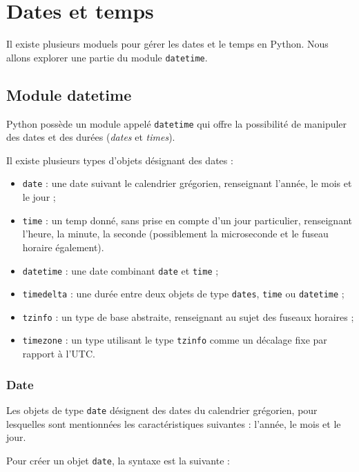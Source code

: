 \documentclass[
  12pt,
]{book}
\providecommand{\tightlist}{%
  \setlength{\itemsep}{0pt}\setlength{\parskip}{0pt}}
\numberwithin{equation}{section}
\numberwithin{countremarque}{section}
\begin{document}
\section{Dates et temps}\label{dates-et-temps}

Il existe plusieurs moduels pour gérer les dates et le temps en Python. Nous allons explorer une partie du module \texttt{datetime}.

\subsection{Module datetime}\label{module-datetime}

Python possède un module appelé \texttt{datetime} qui offre la possibilité de manipuler des dates et des durées (\emph{dates} et \emph{times}).

Il existe plusieurs types d'objets désignant des dates :

\begin{itemize}
\tightlist
\item
  \texttt{date} : une date suivant le calendrier grégorien, renseignant l'année, le mois et le jour ;
\item
  \texttt{time} : un temp donné, sans prise en compte d'un jour particulier, renseignant l'heure, la minute, la seconde (possiblement la microseconde et le fuseau horaire également).
\item
  \texttt{datetime} : une date combinant \texttt{date} et \texttt{time} ;
\item
  \texttt{timedelta} : une durée entre deux objets de type \texttt{dates}, \texttt{time} ou \texttt{datetime} ;
\item
  \texttt{tzinfo} : un type de base abstraite, renseignant au sujet des fuseaux horaires ;
\item
  \texttt{timezone} : un type utilisant le type \texttt{tzinfo} comme un décalage fixe par rapport à l'UTC.
\end{itemize}

\subsubsection{Date}\label{type-date}

Les objets de type \texttt{date} désignent des dates du calendrier grégorien, pour lesquelles sont mentionnées les caractéristiques suivantes : l'année, le mois et le jour.

Pour créer un objet \texttt{date}, la syntaxe est la suivante :
\end{document}
